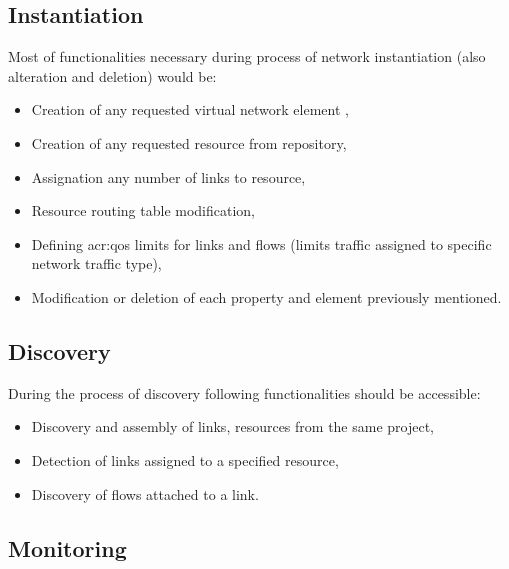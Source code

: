 \documentclass[11pt,openany]{book}
\begin{document}
      \subsection{Instantiation}
      \label{sec:req:func:inst}

        Most of functionalities necessary during process of network instantiation (also alteration and deletion) would
        be:

        \begin{itemize}
          \item Creation of any requested virtual network element ,
          \item Creation of any requested resource  from repository,
          \item Assignation any number of links to resource,
          \item Resource routing table modification,
          \item Defining \gls{acr:qos} limits for links and flows  (limits traffic assigned to specific network traffic type),
          \item Modification or deletion of each property and element previously mentioned.
        \end{itemize}


      \subsection{Discovery}
      \label{sec:req:func:disc}

        During the process of discovery following functionalities should be accessible:

        \begin{itemize}
          \item Discovery and assembly of links, resources from the same project,
          \item Detection of links assigned to a specified resource,
          \item Discovery of flows attached to a link.
        \end{itemize}


      \subsection{Monitoring}
      \label{sec:req:func:acc}

\end{document}
